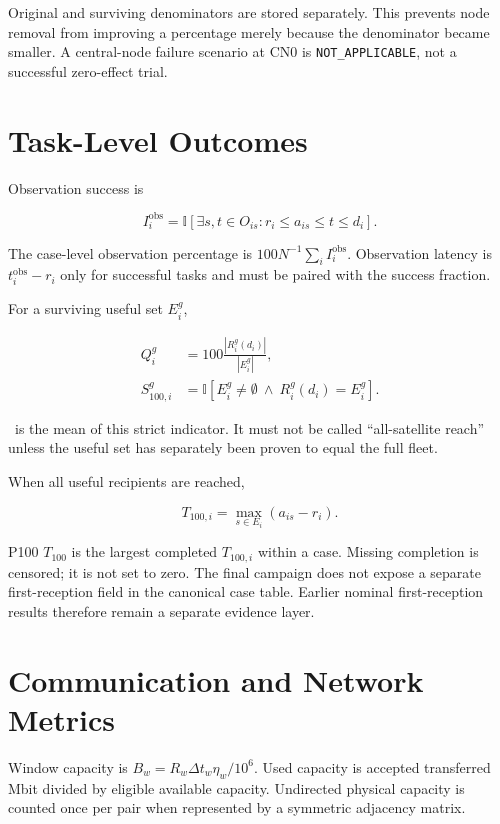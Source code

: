 Original and surviving denominators are stored separately. This prevents node removal from improving a percentage merely because the denominator became smaller. A central-node failure scenario at CN0 is \texttt{NOT\_APPLICABLE}, not a successful zero-effect trial.

\section{Task-Level Outcomes}

Observation success is

\begin{equation}
I_i^{\mathrm{obs}}=\mathbb{I}\!\left[\exists s,t\in O_{is}:r_i\le a_{is}\le t\le d_i\right].
\end{equation}

The case-level observation percentage is $100N^{-1}\sum_i I_i^{\mathrm{obs}}$. Observation latency is $t_i^{\mathrm{obs}}-r_i$ only for successful tasks and must be paired with the success fraction.

For a surviving useful set $E_i^g$,

\begin{align}
Q_i^g &= 100\frac{|R_i^g(d_i)|}{|E_i^g|},\\
S_{100,i}^{g} &= \mathbb{I}[E_i^g\ne\emptyset\ \land\ R_i^g(d_i)=E_i^g].
\end{align}

\Suseful\ is the mean of this strict indicator. It must not be called ``all-satellite reach'' unless the useful set has separately been proven to equal the full fleet.

When all useful recipients are reached,

\begin{equation}
T_{100,i} = \max_{s\in E_i}(a_{is}-r_i).
\end{equation}

P100 $T_{100}$ is the largest completed $T_{100,i}$ within a case. Missing completion is censored; it is not set to zero. The final campaign does not expose a separate first-reception field in the canonical case table. Earlier nominal first-reception results therefore remain a separate evidence layer.

\section{Communication and Network Metrics}

Window capacity is $B_w=R_w\Delta t_w\eta_w/10^6$. Used capacity is accepted transferred Mbit divided by eligible available capacity. Undirected physical capacity is counted once per pair when represented by a symmetric adjacency matrix.

